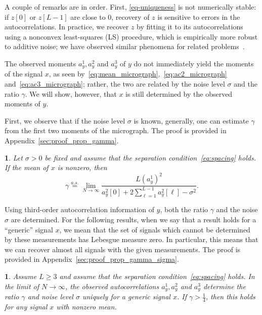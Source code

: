 \documentclass[12pt]{article}
\newcommand{\1}{\mathbf{1}}
\newcommand{\TODO}[1]{{\color{red}{[#1]}}}
\newcommand{\aseq}{\stackrel{a.s.}{=}}
\theoremstyle{plain}
\theoremstyle{definition}
\theoremstyle{remark}
\theoremstyle{plain}
\theoremstyle{remark}
\theoremstyle{plain}
\theoremstyle{plain}
\theoremstyle{plain}
\newtheorem{proposition}[thm]{\protect\propositionname}
\providecommand{\propositionname}{Proposition}
\numberwithin{equation}{section}
\begin{document}
A couple of remarks are in order. First, \eqref{eq-uniqueness} is not numerically stable: if $z[0]$ or $z[L-1]$ are close to 0, recovery of $z$ is sensitive to errors in the autocorrelations. In practice, we recover $z$ by fitting it to its autocorrelations using a nonconvex least-squares (LS) procedure, which is empirically more robust to additive noise; we have observed similar phenomena for related problems~\cite{bendory2017bispectrum,boumal2017heterogeneous,abbe2017multireference}.

The observed moments $a_y^1,a_y^2$ and $a_y^3$ of $y$ do not immediately yield the moments of the signal $x$, as seen by~\eqref{eq:mean_micrograph},~\eqref{eq:ac2_micrograph} and~\eqref{eq:ac3_micrograph}; rather, the two are related by the noise level $\sigma$ and the ratio $\gamma$. We will show, however, that $x$ is still determined by the observed moments of $y$.

First, we observe that if the noise level $\sigma$ is known, generally, one can estimate $\gamma$ from the first two moments of the micrograph. The proof is provided in Appendix~\ref{sec:proof_prop_gamma}.

\begin{proposition} \label{prop:gamma}
	\TODO{Can we do this simultaneously for Poisson? or do we only need to do it for well-separated and invoke the equivalence claim? Not if that claim requires knowledge of $\gamma, \sigma$.}
	Let $\sigma > 0$ be fixed and assume that the separation condition~\eqref{eq:spacing} holds. If the mean of $x$ is nonzero, then 
	\begin{equation}
	\gamma  \aseq \lim_{N \to \infty}\frac{L (a^1_y)^2}{a_y^2[0] + 2\sum_{\ell = 1}^{L-1}a_y^2[\ell]-\sigma^2}.
	\end{equation}
\end{proposition}

Using third-order autocorrelation information of $y$, both the ratio $\gamma$ and the noise $\sigma$ are determined. For the following results, when we say that a result holds for a ``generic'' signal $x$, we mean that the set of signals which cannot be determined by these measurements
has Lebesgue measure zero. 
In particular, this means that we can recover
almost all signals with the given measurements. The proof is provided in Appendix~\ref{sec:proof_prop_gamma_sigma}.

\begin{proposition} \label{prop:gamma_sigma}
	Assume $L \geq 3$ and assume that the separation condition~\eqref{eq:spacing} holds. 
	In the limit of $N\to \infty$, the observed autocorrelations $a_y^1,a_y^2$ and  $a_y^3$ determine the ratio $\gamma$ and noise level $\sigma$ uniquely for a generic signal $x$. If $\gamma > \frac{1}{4}$, then this holds for any signal $x$ with nonzero mean. 
\end{proposition}
\end{document}
